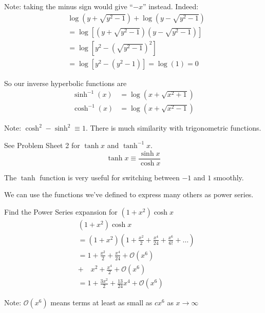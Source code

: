 \documentclass[twoside]{scrartcl}
\begin{document}
Note: taking the minus sign would give ``$-x$'' instead. Indeed: 
\[\begin{aligned}
  &\log(y + \sqrt{y^2-1}) +\log(y - \sqrt{y^2-1})\\
  &= \log[(y + \sqrt{y^2-1})(y - \sqrt{y^2-1})]\\
  &= \log[y^2 - (\sqrt{y^2-1})^2]\\
  &= \log[y^2 - (y^2 - 1)] = \log(1) = 0
\end{aligned}
\]

So our inverse hyperbolic functions are 
\[
\begin{aligned}
  \sinh^{-1}(x) &= \log(x + \sqrt{x^2 + 1})\\
  \cosh^{-1}(x) &= \log(x + \sqrt{x^2 - 1})
\end{aligned}
\]

Note: $\cosh^2 - \sinh^2 \equiv 1$. There is much similarity with trigonometric functions. 

See Problem Sheet 2 for $\tanh x$ and $\tanh^{-1}x$.  
\[\tanh x \equiv \frac{\sinh x}{\cosh x}\]

  \begin{center}
\end{center}

The $\tanh$ function is very useful for switching between $-1$ and $1$ smoothly.
\pagebreak 


We can use the functions we've defined to express many others as power series.\\
\begin{example}
Find the Power Series expansion for $(1+x^2)\cosh x$
\[
\begin{aligned}
  &(1+x^2)\cosh x\\
  &= (1+x^2)\left(1 + \frac{x^2}{2} + \frac{x^4}{24} + \frac{x^6}{6!} + \dots \right)\\
  &= 1 + \frac{x^2}{2} + \frac{x^4}{24} + \mathcal{O}(x^6)\\
  &+ \quad x^2 + \frac{x^4}{2} + \mathcal{O}(x^6)\\
  &= 1 + \frac{3x^2}{2} + \frac{13}{24}x^4 + \mathcal{O}(x^6)
\end{aligned}
\]

Note: $\mathcal{O}(x^6)$ means terms at least as small as $cx^6$ as $x\to \infty$

\end{example}\vspace*{10pt}
\end{document}
